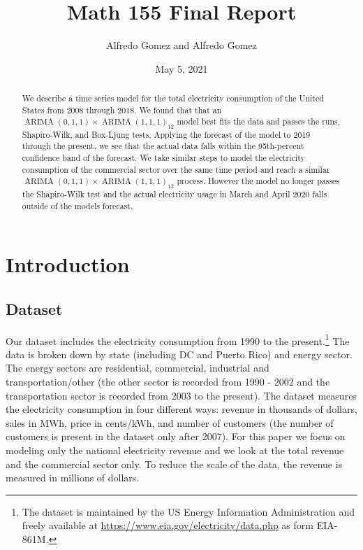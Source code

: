 \documentclass[
]{article}
\title{Math 155 Final Report}
\author{Alfredo Gomez and Alfredo Gomez}
\date{May 5, 2021}
\begin{document}
\maketitle

\begin{abstract}
We describe a time series model for the total electricity consumption of the United States from 2008 through 2018.
We found that that an $\mathop{\mathrm{ARIMA}}(0,1,1) \times \mathop{\mathrm{ARIMA}}(1,1,1)_{12}$ model best fits the data and passes the runs, Shapiro-Wilk, and Box-Ljung tests. 
Applying the forecast of the model to 2019 through the present, we see that the actual data falls within the 95th-percent confidence band of the forecast.
We take similar steps to model the electricity consumption of the commercial sector over the same time period and reach a similar $\mathop{\mathrm{ARIMA}}(0,1,1) \times \mathop{\mathrm{ARIMA}}(1,1,1)_{12}$ process.
However the model no longer passes the Shapiro-Wilk test and the actual electricity usage in March and April 2020 falls outside of the models forecast.
\end{abstract}

\section{Introduction}

\subsection{Dataset}

Our dataset includes the electricity consumption from 1990 to the
present.\footnote{The dataset is maintained by the US Energy Information Administration and freely available at \url{https://www.eia.gov/electricity/data.php} as form EIA-861M.}
The data is broken down by state (including DC and Puerto Rico) and
energy sector. The energy sectors are residential, commercial,
industrial and transportation/other (the other sector is recorded from
1990 - 2002 and the transportation sector is recorded from 2003 to the
present). The dataset measures the electricity consumption in four
different ways: revenue in thousands of dollars, sales in MWh, price in
cents/kWh, and number of customers (the number of customers is present
in the dataset only after 2007). For this paper we focus on modeling
only the national electricity revenue and we look at the total revenue
and the commercial sector only. To reduce the scale of the data, the
revenue is measured in millions of dollars.
\end{document}

